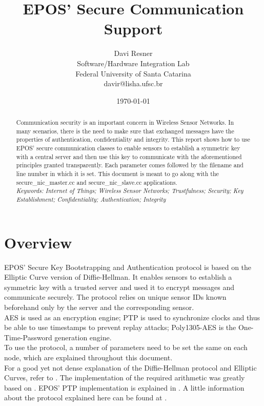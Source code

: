 \documentclass[a4paper,10pt]{article}   %
\title{EPOS' Secure Communication Support}
\author{Davi Resner\\
Software/Hardware Integration Lab\\
Federal University of Santa Catarina\\
davir@lisha.ufsc.br}
\date{\today}
\begin{document}
\maketitle
\begin{abstract}
	Communication security is an important concern in Wireless Sensor Networks. In many scenarios, there is the need to make sure that exchanged messages have the properties of authentication, confidentiality and integrity. This report shows how to use EPOS' secure communication classes to enable sensors to establish a symmetric key with a central server and then use this key to communicate with the aforementioned principles granted transparently. Each parameter comes followed by the filename and line number in which it is set. This document is meant to go along with the secure\_nic\_master.cc and secure\_nic\_slave.cc applications.\\
\textit{Keywords: Internet of Things; Wireless Sensor Networks; Trustfulness; Security; Key Establishment; Confidentiality; Authentication; Integrity}
\end{abstract}

\section{Overview}
\indent	EPOS' Secure Key Bootstrapping and Authentication protocol is based on the Elliptic Curve version of Diffie-Hellman. It enables sensors to establish a symmetric key with a trusted server and used it to encrypt messages and communicate securely. The protocol relies on unique sensor IDs known beforehand only by the server and the corresponding sensor.\\
\indent	AES is used as an encryption engine; PTP \cite{PTP} is used to synchronize clocks and thus be able to use timestamps to prevent replay attacks; Poly1305-AES \cite{POLY} is the One-Time-Password generation engine.\\
\indent	To use the protocol, a number of parameters need to be set the same on each node, which are explained throughout this document.\\
\indent	For a good yet not dense explanation of the Diffie-Hellman protocol and Elliptic Curves, refer to \cite{STALLINGS}. The implementation of the required arithmetic was greatly based on \cite{Brown:2001} \cite{HAC}. EPOS' PTP implementation is explained in \cite{PTP}. A little information about the protocol explained here can be found at \cite{SEUS}.\\
\end{document}
